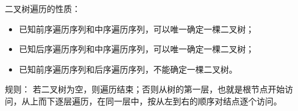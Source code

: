 \begin{frame}\ft{\subsecname}
\textcolor{acolor5}{二叉树遍历的性质：}
\begin{itemize}
\item 已知前序遍历序列和中序遍历序列，可以唯一确定一棵二叉树；\\[0.1in]
\item 已知后序遍历序列和中序遍历序列，可以唯一确定一棵二叉树；\\[0.1in]
\item 已知前序遍历序列和后序遍历序列，不能确定一棵二叉树。
\end{itemize}
\end{frame}
%
\begin{frame}
\textcolor{acolor5}{规则：}
若二叉树为空，则遍历结束；否则从树的第一层，也就是根节点开始访问，从上而下逐层遍历，在同一层中，按从左到右的顺序对结点逐个访问。
\end{frame}
%
\begin{frame}[fragile]
\begin{figure}
\centering

\end{figure} 
\end{frame}
%
\begin{frame}



\end{frame}
%


